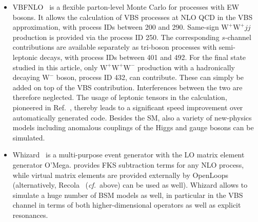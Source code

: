 \documentclass[twocolumn,epjc3]{svjour3} %
\newcommand{\ZM}[1]{{ {\color{green}{ [MZ: #1]}} }}
\newcommand{\PW}{\ensuremath{\text{W}}\xspace}
\begin{document}
\begin{itemize}
      \item {\sc VBFNLO}~\cite{Arnold:2008rz, Arnold:2011wj, Baglio:2014uba} is a flexible
        parton-level Monte Carlo for processes with EW bosons. It
        allows the calculation of VBS processes at NLO QCD in the VBS
        approximation, with process IDs between 200 and 290. Same-sign
        $\PW^+\PW^+jj$ production is provided via the process ID 250. The corresponding
        $s$-channel contributions are available separately as tri-boson processes with
        semi-leptonic decays, with process IDs between 401 and 492. For the
        final state studied in this article, only $\PW^+\PW^+\PW^-$
        production with a hadronically decaying $\PW^-$ boson, process ID 432,
        can contribute. These can simply be added on top of the VBS
        contribution. Interferences between the two are therefore neglected.
        The usage of leptonic tensors in the calculation, pioneered in
        Ref.~\cite{Jager:2006zc}, thereby leads to a significant speed improvement over
        automatically generated code.  Besides the SM, also a variety of
        new-physics models including anomalous couplings of the Higgs and gauge
        bosons can be simulated.

      \item {\sc Whizard}~\cite{Moretti:2001zz,Kilian:2007gr} is a multi-purpose
          event generator with the LO matrix element generator {\sc O'Mega}. \ZM{ if NLO results for this processes cannot be provided, we should skip what follows, or at least clarify the limitations}
    provides FKS subtraction terms for any NLO process, while virtual matrix
    elements are provided externally by {\sc
    OpenLoops}~\cite{Cascioli:2011va} (alternatively, {\sc Recola}~\cite{Actis:2012qn,Actis:2016mpe}
    (\emph{cf.}\ above) can be used as well). {\sc Whizard} allows to simulate a
    huge number of BSM models as well, in particular in
    the VBS channel in terms of both higher-dimensional operators as well as explicit
    resonances.

     \end{itemize} 
\end{document}
